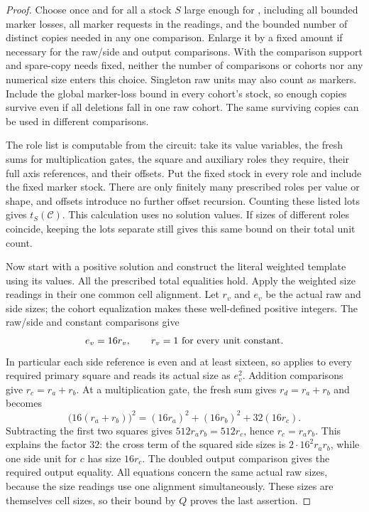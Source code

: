 \begin{proof}
Choose once and for all a stock $S$ large enough for
,
including all bounded marker losses, all marker requests
in the readings, and the bounded number of distinct copies
needed in any one comparison.  Enlarge it by a fixed amount
if necessary for the raw/side and output comparisons.
With the comparison support and spare-copy needs fixed,
neither the number of comparisons or cohorts nor any numerical
size enters this choice.  Singleton raw units may also count
as markers.  Include the global marker-loss bound in every
cohort's stock, so enough copies survive even if all deletions
fall in one raw cohort.  The same surviving copies can be
used in different comparisons.

The role list is computable from the circuit: take its
value variables, the fresh sums for multiplication gates,
the square and auxiliary roles they require, their full
axis references, and their offsets.  Put the fixed stock
in every role and include the fixed marker stock.  There
are only finitely many prescribed roles per value or
shape, and offsets introduce no further offset recursion.
Counting these listed lots gives $t_S(\mathcal C)$.
This calculation uses no solution values.  If sizes of
different roles coincide, keeping the lots separate
still gives this same bound on their total unit count.

Now start with a positive solution and construct the
literal weighted template using its values.  All the
prescribed total equalities hold.  Apply the weighted
size readings in their one common cell alignment.  Let
$r_v$ and $e_v$ be the actual raw and side sizes; the
cohort equalization makes these well-defined positive
integers.  The raw/side and constant comparisons give
\begin{equation}\label{n:read-side}
 e_v=16r_v,\qquad r_v=1\ \hbox{for every unit constant}.
\end{equation}
In particular each side reference is even and at least
sixteen, so  applies to every
required primary square and reads its actual size as
$e_v^2$.  Addition comparisons give $r_c=r_a+r_b$.
At a multiplication gate, the fresh sum gives
$r_d=r_a+r_b$ and  becomes
\begin{equation}\label{n:factor-thirty-two}
 \bigl(16(r_a+r_b)\bigr)^2
   =(16r_a)^2+(16r_b)^2+32(16r_c).
\end{equation}
Subtracting the first two squares gives
$512r_ar_b=512r_c$, hence $r_c=r_ar_b$.
This explains the factor $32$: the cross term of
the squared side sizes is $2\cdot16^2r_ar_b$, while
one side unit for $c$ has size $16r_c$.
The doubled output comparison gives the required
output equality.  All equations concern the same
actual raw sizes, because the size readings use one
alignment simultaneously.  These sizes are themselves
cell sizes, so their bound by $Q$ proves the last
assertion.
\end{proof}

